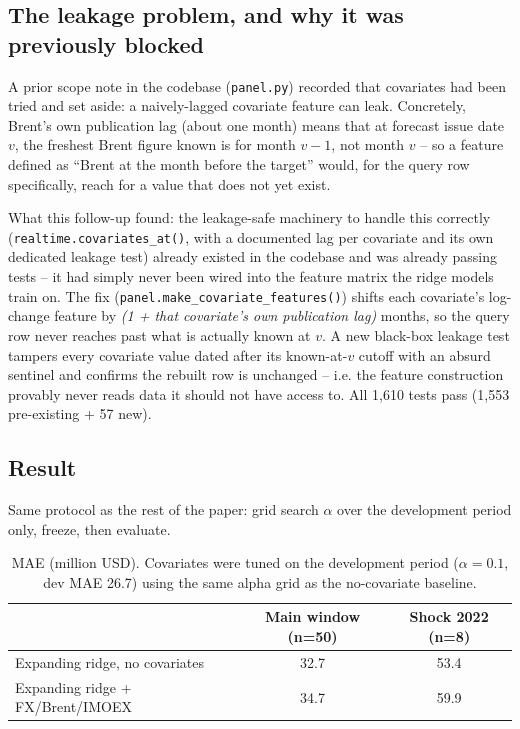 \documentclass[11pt]{article}
\begin{document}
\subsection{The leakage problem, and why it was previously blocked}
A prior scope note in the codebase (\texttt{panel.py}) recorded that covariates had been tried
and set aside: a naively-lagged covariate feature can leak. Concretely, Brent's own publication
lag (about one month) means that at forecast issue date $v$, the freshest Brent figure known is
for month $v{-}1$, not month $v$ -- so a feature defined as ``Brent at the month before the
target'' would, for the query row specifically, reach for a value that does not yet exist.

What this follow-up found: the leakage-safe machinery to handle this correctly
(\texttt{realtime.covariates\_at()}, with a documented lag per covariate and its own dedicated
leakage test) already existed in the codebase and was already passing tests -- it had simply
never been wired into the feature matrix the ridge models train on. The fix
(\texttt{panel.\allowbreak make\_covariate\_features()}) shifts each covariate's log-change feature by
\emph{(1 + that covariate's own publication lag)} months, so the query row never reaches past
what is actually known at $v$. A new black-box leakage test tampers every covariate value dated
after its known-at-$v$ cutoff with an absurd sentinel and confirms the rebuilt row is unchanged
-- i.e. the feature construction provably never reads data it should not have access to. All
1{,}610 tests pass (1{,}553 pre-existing + 57 new).

\subsection{Result}
Same protocol as the rest of the paper: grid search $\alpha$ over the development period only,
freeze, then evaluate.

\begin{table}[h]
\centering
\begin{tabular}{lcc}
\toprule
 & Main window (n=50) & Shock 2022 (n=8) \\
\midrule
Expanding ridge, no covariates & 32.7 & 53.4 \\
Expanding ridge + FX/Brent/IMOEX & 34.7 & 59.9 \\
\bottomrule
\end{tabular}
\caption{MAE (million USD). Covariates were tuned on the development period ($\alpha=0.1$,
dev MAE 26.7) using the same alpha grid as the no-covariate baseline.}
\end{table}
\end{document}
